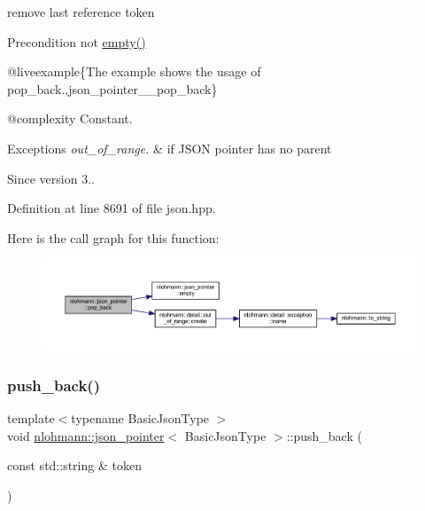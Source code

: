 remove last reference token 

\begin{DoxyPrecond}{Precondition}
not {\ttfamily \mbox{\hyperlink{classnlohmann_1_1json__pointer_a649252bda4a2e75a0915b11a25d8bcc3}{empty()}}}
\end{DoxyPrecond}
@liveexample\{The example shows the usage of {\ttfamily pop\+\_\+back}.,json\+\_\+pointer\+\_\+\+\_\+pop\+\_\+back\}

@complexity Constant.


\begin{DoxyExceptions}{Exceptions}
{\em out\+\_\+of\+\_\+range.} & if J\+S\+ON pointer has no parent\\
\hline
\end{DoxyExceptions}
\begin{DoxySince}{Since}
version 3.. 
\end{DoxySince}


Definition at line 8691 of file json.\+hpp.

Here is the call graph for this function\+:
\nopagebreak
\begin{figure}[H]
\begin{center}
\leavevmode
\includegraphics[width=350pt]{classnlohmann_1_1json__pointer_a4b1ee4d511ca195bed896a3da47e264c_cgraph}
\end{center}
\end{figure}
\mbox{\label{classnlohmann_1_1json__pointer_a697d12b5bd6205f8866691b166b7c7dc}} 
\subsubsection{\texorpdfstring{push\_back()}{push\_back()}\hspace{0.1cm}{\footnotesize\ttfamily [1/2]}}
{\footnotesize\ttfamily template$<$typename Basic\+Json\+Type $>$ \\
void \mbox{\hyperlink{classnlohmann_1_1json__pointer}{nlohmann\+::json\+\_\+pointer}}$<$ Basic\+Json\+Type $>$\+::push\+\_\+back (\begin{DoxyParamCaption}\item[{const std\+::string \&}]{token }\end{DoxyParamCaption})\hspace{0.3cm}{\ttfamily [inline]}}



